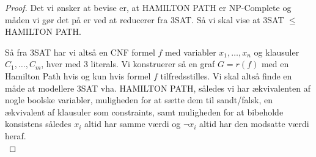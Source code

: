 \begin{proof}
 Det vi ønsker at bevise er, at HAMILTON PATH er NP-Complete og måden vi gør det på er ved at reducerer fra 3SAT. Så vi skal vise at 3SAT $\leq$ HAMILTON PATH.

Så fra 3SAT har vi altså en CNF formel $f$ med variabler $x_1,\hdots,x_n$ og klausuler $C_1,\hdots,C_m$, hver med 3 literals. Vi konstruerer så en graf $G = r(f)$ med en Hamilton Path hvis og kun hvis formel $f$ tilfredsstilles.
Vi skal altså finde en måde at modellere 3SAT vha. HAMILTON PATH, således vi har ækvivalenten af nogle boolske variabler, muligheden for at sætte dem til sandt/falsk, en ækvivalent af klausuler som constraints, samt muligheden for at bibeholde konsistens således $x_i$ altid har samme værdi og $\neg x_i$ altid har den modsatte værdi heraf.\\


\end{proof}
